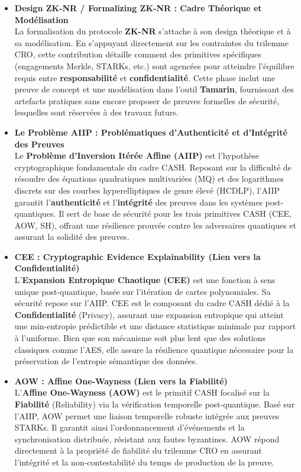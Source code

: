 \documentclass[11pt]{article}
\begin{document}
\begin{itemize}
    \item \textbf{Design ZK-NR / Formalizing ZK-NR : Cadre Théorique et Modélisation} \\
    La formalisation du protocole \textbf{ZK-NR} s'attache à son design théorique et à sa modélisation. En s'appuyant directement sur les contraintes du trilemme CRO, cette contribution détaille comment des primitives spécifiques (engagements Merkle, STARKs, etc.) sont agencées pour atteindre l'équilibre requis entre \textbf{responsabilité} et \textbf{confidentialité}. Cette phase inclut une preuve de concept et une modélisation dans l'outil \textbf{Tamarin}, fournissant des artefacts pratiques sans encore proposer de preuves formelles de sécurité, lesquelles sont réservées à des travaux futurs.

    \item \textbf{Le Problème AIIP : Problématiques d'Authenticité et d'Intégrité des Preuves} \\
    Le \textbf{Problème d'Inversion Itérée Affine (AIIP)} est l'hypothèse cryptographique fondamentale du cadre CASH. Reposant sur la difficulté de résoudre des équations quadratiques multivariées (MQ) et des logarithmes discrets sur des courbes hyperelliptiques de genre élevé (HCDLP), l'AIIP garantit l'\textbf{authenticité} et l'\textbf{intégrité} des preuves dans les systèmes post-quantiques. Il sert de base de sécurité pour les trois primitives CASH (CEE, AOW, SH), offrant une résilience prouvée contre les adversaires quantiques et assurant la solidité des preuves.

    \item \textbf{CEE : Cryptographic Evidence Explainability (Lien vers la Confidentialité)} \\
    L'\textbf{Expansion Entropique Chaotique (CEE)} est une fonction à sens unique post-quantique, basée sur l'itération de cartes polynomiales. Sa sécurité repose sur l'AIIP. CEE est le composant du cadre CASH dédié à la \textbf{Confidentialité} (Privacy), assurant une expansion entropique qui atteint une min-entropie prédictible et une distance statistique minimale par rapport à l'uniforme. Bien que son mécanisme soit plus lent que des solutions classiques comme l'AES, elle assure la résilience quantique nécessaire pour la préservation de l'entropie sémantique des données.

    \item \textbf{AOW : Affine One-Wayness (Lien vers la Fiabilité)} \\
    L'\textbf{Affine One-Wayness (AOW)} est le primitif CASH focalisé sur la \textbf{Fiabilité} (Reliability) via la vérification temporelle post-quantique. Basé sur l'AIIP, AOW permet une liaison temporelle robuste intégrée aux preuves STARKs. Il garantit ainsi l'ordonnancement d'événements et la synchronisation distribuée, résistant aux fautes byzantines. AOW répond directement à la propriété de fiabilité du trilemme CRO en assurant l'intégrité et la non-contestabilité du temps de production de la preuve.


\end{itemize}
\end{document}
